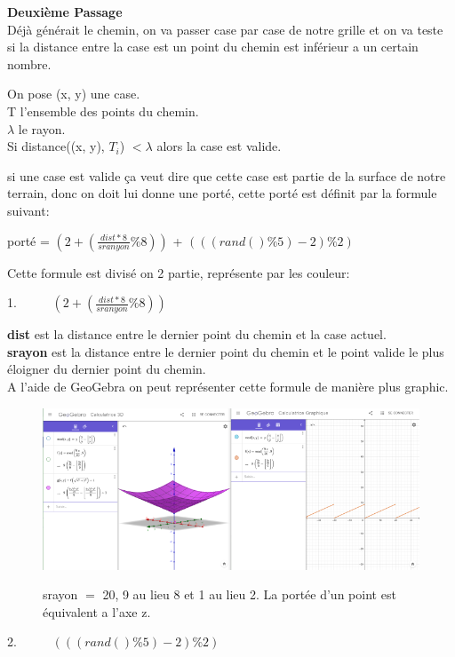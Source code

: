 \documentclass{article}
\begin{document}
\textbf{\Large{Deuxième Passage}}\\
Déjà générait le chemin, on va passer case par case de notre grille et on va teste si la distance entre la case est un point du chemin est inférieur a un certain nombre.
\begin{center}
On pose (x, y) une case.\\
T l'ensemble des points du chemin.\\
$\lambda$ le rayon.\\
Si distance((x, y), $T_i$) $< \lambda$ alors la case est valide.
\end{center}
si une case est valide ça veut dire que cette case est partie de la surface de notre terrain, donc on doit lui donne une porté, cette porté est définit par la formule suivant:
\begin{center}
	porté = {\color{color1}$(2 + (\frac{dist*8}{sranyon}\%8))$} + 
	{\color{color2}$(((rand()\%5)-2)\%2)$}
\end{center}
Cette formule est divisé on 2 partie, représente par les couleur:
\begin{center}
	1.~~~~~ $(2 + (\frac{dist*8}{sranyon}\%8))$
\end{center}
\textbf{dist} est la distance entre le dernier point du chemin et la case actuel.\\
\textbf{srayon} est la distance entre le dernier point du chemin et le point valide le plus éloigner du dernier point du chemin.\\
A l'aide de GeoGebra on peut représenter cette formule de manière plus graphic.\\
\begin{figure}[!h]
\centering
 \includegraphics[scale=0.5]{Images/Geogebraimg1.png}\\
 \caption{srayon $=$ 20, 9 au lieu 8 et 1 au lieu 2. La portée d'un point est équivalent a l'axe z.}
\end{figure} 
\begin{center}
	2.~~~~~ $(((rand()\%5)-2)\%2)$\\
\end{center}
\end{document}
